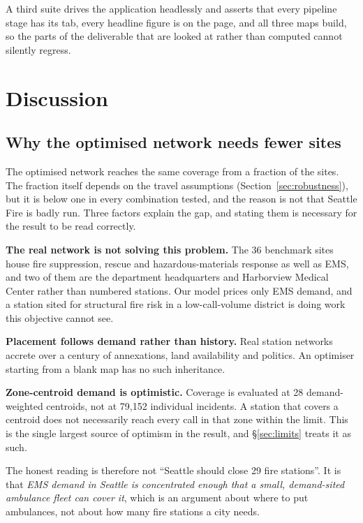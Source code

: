 \documentclass[conference]{IEEEtran}
\begin{document}
A third suite drives the application headlessly and asserts that every pipeline
stage has its tab, every headline figure is on the page, and all three maps
build, so the parts of the deliverable that are looked at rather than computed
cannot silently regress.

\section{Discussion}

\subsection{Why the optimised network needs fewer sites}

The optimised network reaches the same coverage from a fraction of the sites.
The fraction itself depends on the travel assumptions (Section~\ref{sec:robustness}),
but it is below one in every combination tested, and the reason is not that
Seattle Fire is badly run. Three factors
explain the gap, and stating them is necessary for the result to be read
correctly.

\textbf{The real network is not solving this problem.} The 36 benchmark sites
house fire suppression, rescue and hazardous-materials response as well as EMS,
and two of them are the department headquarters and Harborview Medical Center
rather than numbered stations.
Our model prices only EMS demand, and a station sited for structural fire risk
in a low-call-volume district is doing work this objective cannot see.

\textbf{Placement follows demand rather than history.} Real station networks
accrete over a century of annexations, land availability and politics. An
optimiser starting from a blank map has no such inheritance.

\textbf{Zone-centroid demand is optimistic.} Coverage is evaluated at 28
demand-weighted centroids, not at 79{,}152 individual incidents. A station that
covers a centroid does not necessarily reach every call in that zone within the
limit. This is the single largest source of optimism in the result, and
\S\ref{sec:limits} treats it as such.

The honest reading is therefore not ``Seattle should close 29 fire stations''.
It is that \emph{EMS demand in Seattle is concentrated enough that a small,
demand-sited ambulance fleet can cover it}, which is an argument about where to
put ambulances, not about how many fire stations a city needs.
\end{document}
